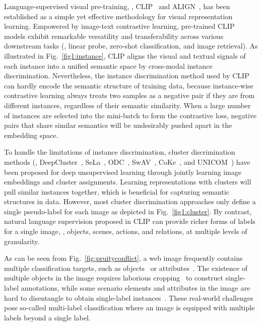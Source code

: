 Language-supervised visual pre-training, \eg, CLIP~\cite{radford2021learning} and ALIGN~\cite{jia2021scaling}, 
has been established as a simple yet effective methodology for visual representation learning. Empowered by image-text contrastive learning, pre-trained CLIP models exhibit remarkable versatility and transferability across various downstream tasks (\eg, linear probe, zero-shot classification, and image retrieval). As illustrated in Fig.~\ref{fig1:instance}, CLIP aligns the visual and textual signals of each instance into a unified semantic space by cross-modal instance discrimination. Nevertheless, the instance discrimination method used by CLIP can hardly encode the semantic structure of training data, because instance-wise contrastive learning always treats two samples as a negative pair if they are from different instances, regardless of their semantic similarity. When a large number of instances are selected into the mini-batch to form the contrastive loss, negative pairs that share similar semantics will be undesirably pushed apart in the embedding space. 

To handle the limitations of instance discrimination, cluster discrimination methods (\eg, DeepCluster~\cite{caron2018deep}, SeLa~\cite{asano2019self}, ODC~\cite{zhan2020online}, SwAV~\cite{caron2020unsupervised}, CoKe~\cite{qian2022unsupervised}, and UNICOM~\cite{an2023unicom}) have been proposed for deep unsupervised learning through jointly learning image embeddings and cluster assignments. Learning representations with clusters will pull similar instances together, which is beneficial for capturing semantic structures in data. However, most cluster discrimination approaches only define a single pseudo-label for each image as depicted in Fig.~\ref{fig1:cluster}. By contrast, natural language supervision proposed in CLIP can provide richer forms of labels for a single image, \eg, objects, scenes, actions, and relations, at multiple levels of granularity. 

As can be seen from Fig.~\ref{fig:pruityconflict}, 
a web image frequently contains multiple classification targets, such as objects~\cite{yang2016exploit} or attributes~\cite{pham2021learning}. The existence of multiple objects in the image requires laborious cropping~\cite{Li_2023_ICCV,Abdelfattah_2023_ICCV} to construct single-label annotations, while some scenario elements and attributes in the image are hard to disentangle to obtain single-label instances~\cite{pham2021learning,Zhu_2023_ICCV}. These real-world challenges pose so-called multi-label classification where an image is equipped with multiple labels beyond a single label.

